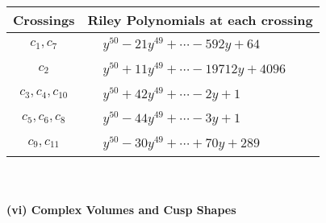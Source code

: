 \documentclass[1p]{elsarticle_modified}
\theoremstyle{definition}
\begin{document}
\begin{tabular}{m{50pt}|m{274pt}}
Crossings & \hspace{64pt}Riley Polynomials at each crossing \\
\hline $$\begin{aligned}c_{1},c_{7}\end{aligned}$$&$\begin{aligned}
&y^{50}-21 y^{49}+\cdots-592 y+64
\end{aligned}$\\
\hline $$\begin{aligned}c_{2}\end{aligned}$$&$\begin{aligned}
&y^{50}+11 y^{49}+\cdots-19712 y+4096
\end{aligned}$\\
\hline $$\begin{aligned}c_{3},c_{4},c_{10}\end{aligned}$$&$\begin{aligned}
&y^{50}+42 y^{49}+\cdots-2 y+1
\end{aligned}$\\
\hline $$\begin{aligned}c_{5},c_{6},c_{8}\end{aligned}$$&$\begin{aligned}
&y^{50}-44 y^{49}+\cdots-3 y+1
\end{aligned}$\\
\hline $$\begin{aligned}c_{9},c_{11}\end{aligned}$$&$\begin{aligned}
&y^{50}-30 y^{49}+\cdots+70 y+289
\end{aligned}$\\
\hline
\end{tabular}\\~\\
\newpage\flushleft \textbf{(vi) Complex Volumes and Cusp Shapes}
\end{document}
